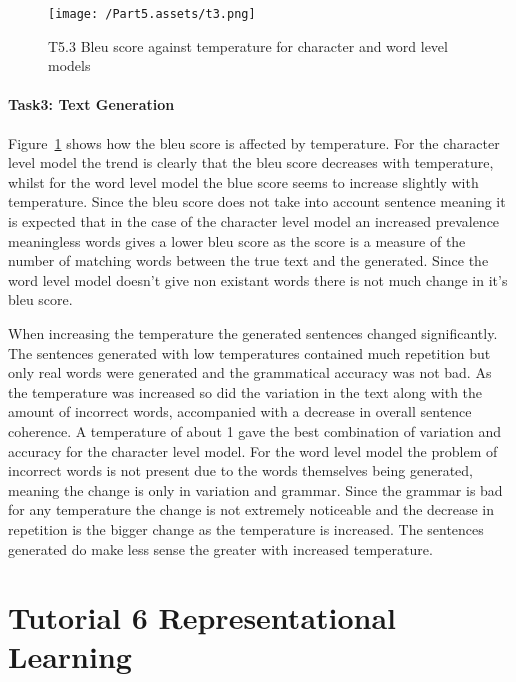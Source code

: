 \documentclass[10pt,twocolumn,letterpaper]{article}
\begin{document}
\begin{figure}[ht]
    \begin{center}
        \texttt{[image: /Part5.assets/t3.png]}
        \caption{T5.3 Bleu score against temperature for character and word level models}\label{fig:t53}
        \vspace{-0.5cm}
    \end{center}
\end{figure}
\vspace{-0.6cm}
\paragraph{Task3: Text Generation}
Figure~\ref{fig:t53} shows how the bleu score is affected by temperature. For the character level model the trend is clearly that the bleu score decreases with temperature, whilst for the word level model the blue score seems to increase slightly with temperature. Since the bleu score does not take into account sentence meaning it is expected that in the case of the character level model an increased prevalence meaningless words gives a lower bleu score as the score is a measure of the number of matching words between the true text and the generated\cite{bleu}. Since the word level model doesn't give non existant words there is not much change in it's bleu score. 

When increasing the temperature the generated sentences changed significantly. The sentences generated with low temperatures contained much repetition but only real words were generated and the grammatical accuracy was not bad. As the temperature was increased so did the variation in the text along with the amount of incorrect words, accompanied with a decrease in overall sentence coherence. A temperature of about 1 gave the best combination of variation and accuracy for the character level model. For the word level model the problem of incorrect words is not present due to the words themselves being generated, meaning the change is only in variation and grammar. Since the grammar is bad for any temperature the change is not extremely noticeable and the decrease in repetition is the bigger change as the temperature is increased. The sentences generated do make less sense the greater with increased temperature.

\section{Tutorial 6 Representational Learning}
\end{document}
